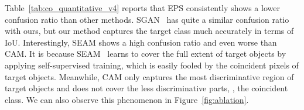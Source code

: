 \documentclass[final]{cvpr}
\begin{document}
Table~\ref{tab:co_quantitative_v4} reports that EPS consistently shows a lower confusion ratio than other methods. SGAN~\cite{yao2020saliency} has quite a similar confusion ratio with ours, but our method captures the target class much accurately in terms of IoU. Interestingly, SEAM shows a high confusion ratio and even worse than CAM. It is because SEAM~\cite{wang2020self} learns to cover the full extent of target objects by applying self-supervised training, which is easily fooled by the coincident pixels of target objects. Meanwhile, CAM only captures the most discriminative region of target objects and does not cover the less discriminative parts, \eg, the coincident class. We can also observe this phenomenon in Figure~\ref{fig:ablation}.



\newcommand{\R}{\textcolor{red}}
\newcommand{\B}{\textcolor{blue}}
\end{document}
